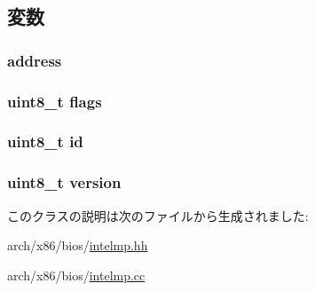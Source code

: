 \subsection{変数}
\hypertarget{classX86ISA_1_1IntelMP_1_1IOAPIC_ac0d31ca829f934cccd89f8054e02773e}{
\subsubsection[{address}]{ {\bf address}}}
\label{classX86ISA_1_1IntelMP_1_1IOAPIC_ac0d31ca829f934cccd89f8054e02773e}
\hypertarget{classX86ISA_1_1IntelMP_1_1IOAPIC_aa2585d779da0ab21273a8d92de9a0ebe}{
\subsubsection[{flags}]{\setlength{\rightskip}{0pt plus 5cm}uint8\_\-t {\bf flags}}}
\label{classX86ISA_1_1IntelMP_1_1IOAPIC_aa2585d779da0ab21273a8d92de9a0ebe}
\hypertarget{classX86ISA_1_1IntelMP_1_1IOAPIC_a1e6927fa1486224044e568f9c370519b}{
\subsubsection[{id}]{\setlength{\rightskip}{0pt plus 5cm}uint8\_\-t {\bf id}}}
\label{classX86ISA_1_1IntelMP_1_1IOAPIC_a1e6927fa1486224044e568f9c370519b}
\hypertarget{classX86ISA_1_1IntelMP_1_1IOAPIC_ab22abc2906422da61885ac6c8e6a1a59}{
\subsubsection[{version}]{\setlength{\rightskip}{0pt plus 5cm}uint8\_\-t {\bf version}}}
\label{classX86ISA_1_1IntelMP_1_1IOAPIC_ab22abc2906422da61885ac6c8e6a1a59}


このクラスの説明は次のファイルから生成されました:\begin{DoxyCompactItemize}
\item 
arch/x86/bios/\hyperlink{intelmp_8hh}{intelmp.hh}\item 
arch/x86/bios/\hyperlink{intelmp_8cc}{intelmp.cc}\end{DoxyCompactItemize}
